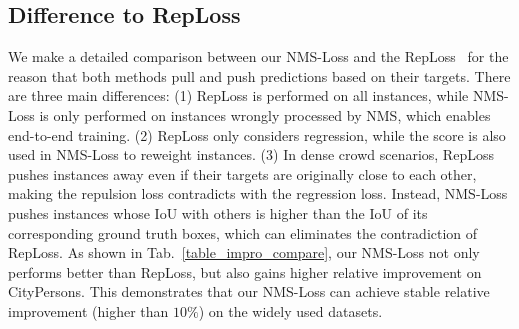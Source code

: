 \documentclass[sigconf]{acmart}
\begin{document}
\subsection{Difference to RepLoss}
We make a detailed comparison between our NMS-Loss and the RepLoss~\cite{wang2018repulsion} for the reason that both methods pull and push predictions based on their targets. There are three main differences:
(1) RepLoss is performed on all instances, while NMS-Loss is only performed on instances wrongly processed by NMS, which enables end-to-end training.
(2) RepLoss only considers regression, while the score is also used in NMS-Loss to reweight instances.
(3) In dense crowd scenarios, RepLoss pushes instances away even if their targets are originally close to each other, making the repulsion loss contradicts with the regression loss.
Instead, NMS-Loss pushes instances whose IoU with others is higher than the IoU of its corresponding ground truth boxes, which can eliminates the contradiction of RepLoss. As shown in Tab.~\ref{table_impro_compare}, our NMS-Loss not only performs better than RepLoss, but also gains higher relative improvement on CityPersons. This demonstrates that our NMS-Loss can achieve stable relative improvement (higher than $10\%$) on the widely used datasets.



\begin{table}[t]
\small
\caption{\textbf{Comparison between RepLoss and NMS-Loss on the CityPersons}. We use $MR_b$, $MR$, $MR_i$, $MR_r$ to represent the $MR$ of baseline model, $MR$ of complete model, $MR$ of the improvement and relative improvement based on the baseline, respectively.}
\vspace{-1mm}
\begin{center}
\end{center}
\vspace{-3mm}
\label{table_impro_compare}
\end{table}
\end{document}
